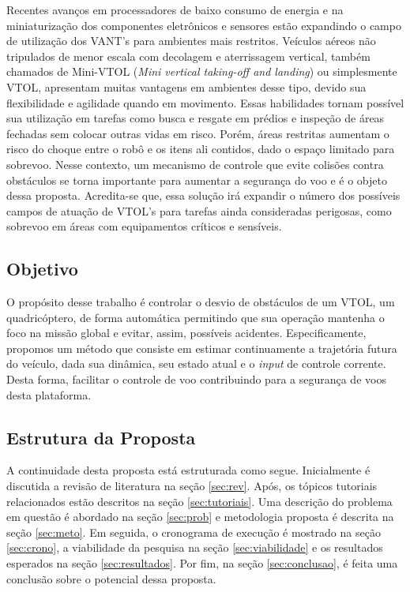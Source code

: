 \documentclass[a4paper, 12pt]{article}
\begin{document}
Recentes avanços em processadores de baixo consumo de energia e na miniaturização dos componentes eletrônicos e sensores estão expandindo o campo de utilização dos VANT's para ambientes mais restritos. Veículos aéreos não tripulados de menor escala com decolagem e aterrissagem vertical, também chamados de Mini-VTOL (\textit{Mini vertical taking-off and landing}) ou simplesmente VTOL, apresentam muitas vantagens em ambientes desse tipo, devido sua flexibilidade e agilidade quando em movimento. Essas habilidades tornam possível sua utilização em tarefas como busca e resgate em prédios e inspeção de áreas fechadas sem colocar outras vidas em risco. Porém, áreas restritas aumentam o risco do choque entre o robô e os itens ali contidos, dado o espaço limitado para sobrevoo. Nesse contexto, um mecanismo de controle que evite colisões contra obstáculos se torna importante para aumentar a segurança do voo e é o objeto dessa proposta. Acredita-se que, essa solução irá expandir o número dos possíveis campos de atuação de VTOL's para tarefas ainda consideradas perigosas, como sobrevoo em áreas com equipamentos críticos e sensíveis.



\subsection{Objetivo}

O propósito desse trabalho é controlar o desvio de obstáculos de um VTOL, um quadricóptero, de forma automática permitindo que sua operação mantenha o foco na missão global e evitar, assim, possíveis acidentes. Especificamente, propomos um método que consiste em estimar continuamente a trajetória futura do veículo, dada sua dinâmica, seu estado atual e o \textit{input} de controle corrente. Desta forma, facilitar o controle de voo contribuindo para a segurança de voos desta plataforma. 



\subsection{Estrutura da Proposta}

A continuidade desta proposta está estruturada como segue. Inicialmente é discutida a revisão de literatura na seção \ref{sec:rev}. Após, os tópicos tutoriais relacionados estão descritos na seção \ref{sec:tutoriais}. Uma descrição do problema em questão é abordado na seção \ref{sec:prob} e metodologia proposta é descrita na seção \ref{sec:meto}. Em seguida, o cronograma de execução é mostrado na seção \ref{sec:crono}, a viabilidade da pesquisa na seção \ref{sec:viabilidade} e os resultados esperados na seção \ref{sec:resultados}. Por fim, na seção \ref{sec:conclusao}, é feita uma conclusão sobre o potencial dessa proposta. 
\end{document}
